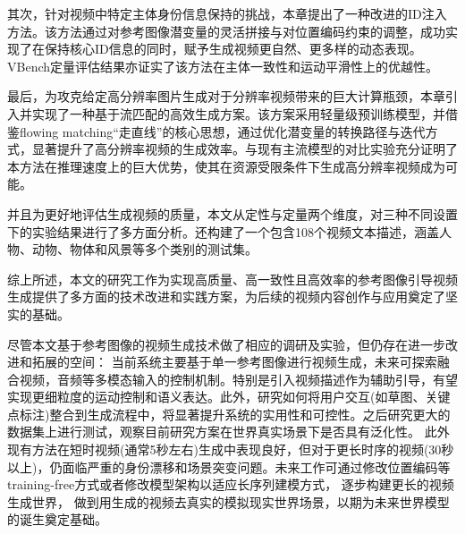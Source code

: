 其次，针对视频中特定主体身份信息保持的挑战，本章提出了一种改进的ID注入方法。该方法通过对参考图像潜变量的灵活拼接与对位置编码约束的调整，成功实现了在保持核心ID信息的同时，赋予生成视频更自然、更多样的动态表现。VBench定量评估结果亦证实了该方法在主体一致性和运动平滑性上的优越性。

最后，为攻克给定高分辨率图片生成对于分辨率视频带来的巨大计算瓶颈，本章引入并实现了一种基于流匹配的高效生成方案。该方案采用轻量级预训练模型，并借鉴flowing matching“走直线”的核心思想，通过优化潜变量的转换路径与迭代方式，显著提升了高分辨率视频的生成效率。与现有主流模型的对比实验充分证明了本方法在推理速度上的巨大优势，使其在资源受限条件下生成高分辨率视频成为可能。

并且为更好地评估生成视频的质量，本文从定性与定量两个维度，对三种不同设置下的实验结果进行了多方面分析。还构建了一个包含108个视频文本描述，涵盖人物、动物、物体和风景等多个类别的测试集。


综上所述，本文的研究工作为实现高质量、高一致性且高效率的参考图像引导视频生成提供了多方面的技术改进和实践方案，为后续的视频内容创作与应用奠定了坚实的基础。

尽管本文基于参考图像的视频生成技术做了相应的调研及实验，但仍存在进一步改进和拓展的空间：
当前系统主要基于单一参考图像进行视频生成，未来可探索融合视频，音频等多模态输入的控制机制。特别是引入视频描述作为辅助引导，有望实现更细粒度的运动控制和语义表达。此外，研究如何将用户交互(如草图、关键点标注)整合到生成流程中，将显著提升系统的实用性和可控性。之后研究更大的数据集上进行测试，观察目前研究方案在世界真实场景下是否具有泛化性。
此外现有方法在短时视频(通常5秒左右)生成中表现良好，但对于更长时序的视频(30秒以上)，仍面临严重的身份漂移和场景突变问题。未来工作可通过修改位置编码等training-free方式或者修改模型架构以适应长序列建模方式， 逐步构建更长的视频生成世界， 做到用生成的视频去真实的模拟现实世界场景，以期为未来世界模型的诞生奠定基础。
